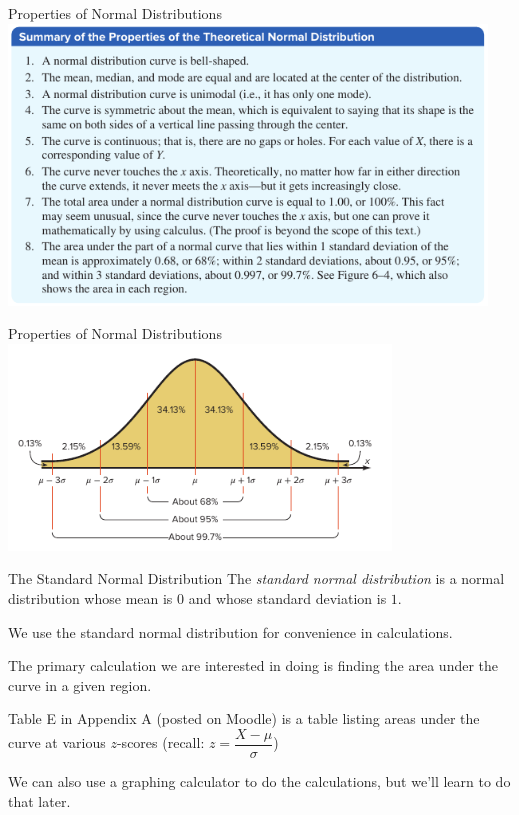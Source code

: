 \documentclass[t, aspectratio=169]{beamer}
\newcommand{\?}{\stackrel{?}{=}}
\begin{document}
	\begin{frame}{Properties of Normal Distributions}
		\includegraphics[width=5in]{norm-dist-prop.png}
	\end{frame}

	\begin{frame}{Properties of Normal Distributions}
		\includegraphics[width=4in]{norm-dist-percentages.png}
	\end{frame}

	\begin{frame}{The Standard Normal Distribution}
		The \textit{standard normal distribution} is a normal distribution whose mean is $0$ and whose standard deviation is $1$. \pause
		
		We use the standard normal distribution for convenience in calculations. \pause
		
		The primary calculation we are interested in doing is finding the area under the curve in a given region. \pause
		
		Table E in Appendix A (posted on Moodle) is a table listing areas under the curve at various $z$-scores (recall: $z = \dfrac{X - \mu}{\sigma}$) \pause
		
		We can also use a graphing calculator to do the calculations, but we'll learn to do that later.
	\end{frame}
\end{document}
